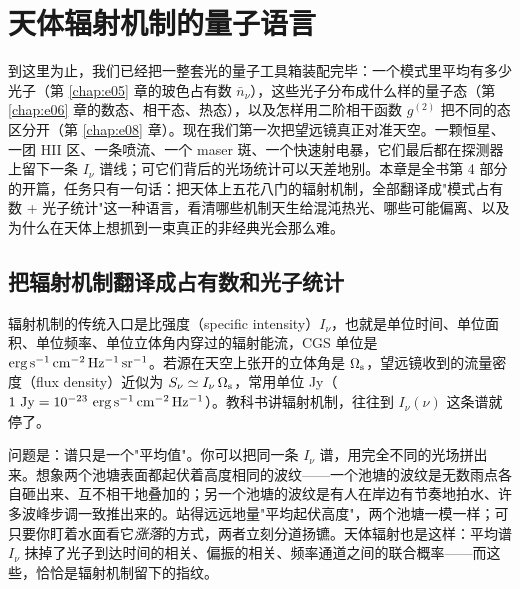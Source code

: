 \chapter{天体辐射机制的量子语言}
\label{chap:e16}

\begin{chapteropening}
到这里为止，我们已经把一整套光的量子工具箱装配完毕：一个模式里平均有多少光子（第 \ref{chap:e05} 章的玻色占有数 \(\bar n_\nu\)），这些光子分布成什么样的量子态（第 \ref{chap:e06} 章的数态、相干态、热态），以及怎样用二阶相干函数 \(g^{(2)}\) 把不同的态区分开（第 \ref{chap:e08} 章）。现在我们第一次把望远镜真正对准天空。一颗恒星、一团 HII 区、一条喷流、一个 maser 斑、一个快速射电暴，它们最后都在探测器上留下一条 \(I_\nu\) 谱线；可它们背后的光场统计可以天差地别。本章是全书第 4 部分的开篇，任务只有一句话：把天体上五花八门的辐射机制，全部翻译成"模式占有数 + 光子统计"这一种语言，看清哪些机制天生给混沌热光、哪些可能偏离、以及为什么在天体上想抓到一束真正的非经典光会那么难。
\end{chapteropening}

\section{把辐射机制翻译成占有数和光子统计}
\label{sec:e16-translation}

辐射机制的传统入口是比强度（specific intensity）\(I_\nu\)，也就是单位时间、单位面积、单位频率、单位立体角内穿过的辐射能流，CGS 单位是 \({\rm erg\,s^{-1}\,cm^{-2}\,Hz^{-1}\,sr^{-1}}\)。若源在天空上张开的立体角是 \(\Omega_{\rm s}\)，望远镜收到的流量密度（flux density）近似为 \(S_\nu\simeq I_\nu\,\Omega_{\rm s}\)，常用单位 Jy（\(1~{\rm Jy}=10^{-23}~{\rm erg\,s^{-1}\,cm^{-2}\,Hz^{-1}}\)）。教科书讲辐射机制，往往到 \(I_\nu(\nu)\) 这条谱就停了。

问题是：谱只是一个"平均值"。你可以把同一条 \(I_\nu\) 谱，用完全不同的光场拼出来。想象两个池塘表面都起伏着高度相同的波纹——一个池塘的波纹是无数雨点各自砸出来、互不相干地叠加的；另一个池塘的波纹是有人在岸边有节奏地拍水、许多波峰步调一致推出来的。站得远远地量"平均起伏高度"，两个池塘一模一样；可只要你盯着水面看它\emph{涨落}的方式，两者立刻分道扬镳。天体辐射也是这样：平均谱 \(I_\nu\) 抹掉了光子到达时间的相关、偏振的相关、频率通道之间的联合概率——而这些，恰恰是辐射机制留下的指纹。

